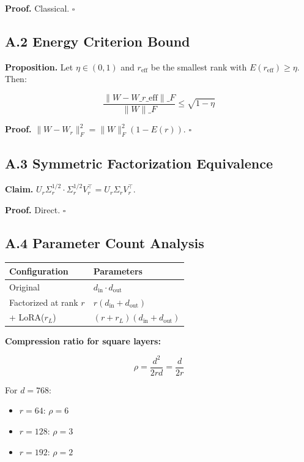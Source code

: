 \textbf{Proof.} Classical. $\square$

\subsection{A.2 Energy Criterion Bound}

\textbf{Proposition.} Let $\eta \in (0, 1)$ and $r_\text{eff}$ be the smallest 
rank with $E(r_\text{eff}) \geq \eta$. Then:

\[
\frac{\|W - W\_{r\_\text{eff}}\|\_F}{\|W\|\_F} \leq \sqrt{1 - \eta}
\tag{A.2}
\]

\textbf{Proof.} $\|W - W_r\|_F^2 = \|W\|_F^2(1 - E(r))$. $\square$

\subsection{A.3 Symmetric Factorization Equivalence}

\textbf{Claim.} $U_r \Sigma_r^{1/2} \cdot \Sigma_r^{1/2} V_r^\top = U_r \Sigma_r V_r^\top$.

\textbf{Proof.} Direct. $\square$

\subsection{A.4 Parameter Count Analysis}

\begin{table}[H]
\centering
\small
\begin{tabular}{ll}
\toprule
\textbf{Configuration} & \textbf{Parameters} \\
\midrule
Original & $d_\text{in} \cdot d_\text{out}$ \\
Factorized at rank $r$ & $r(d_\text{in} + d_\text{out})$ \\
+ LoRA($r_L$) & $(r + r_L)(d_\text{in} + d_\text{out})$ \\
\bottomrule
\end{tabular}
\end{table}

\textbf{Compression ratio for square layers:}

\[
\rho = \frac{d^2}{2rd} = \frac{d}{2r}
\tag{A.3}
\]

For $d = 768$:
\begin{itemize}
\item $r = 64$: $\rho = 6$
\item $r = 128$: $\rho = 3$
\item $r = 192$: $\rho = 2$

\end{itemize}
